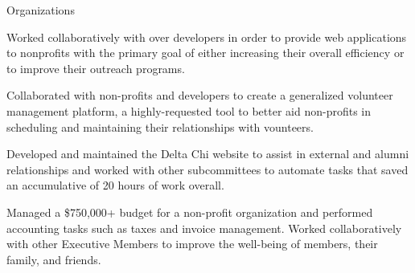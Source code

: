 \documentclass{resume} %
\begin{document}
\begin{workSection}{Organizations}
    \customItem[
        title=Bits of Good,
        keyHighlight=Developer,
        duration=January 2023 – Present,
        location=Atlanta{,} GA
    ]
     \begin{bullets}
       \item Worked collaboratively with over developers in order to provide web applications to nonprofits with the primary goal of either increasing their overall efficiency or to improve their outreach programs.
       \item Collaborated with non-profits and developers to create a generalized volunteer management platform, a highly-requested tool to better aid non-profits in scheduling and maintaining their relationships with vounteers.

     \end{bullets}
    \customItem[
        title=Delta Chi Fraternity,
        keyHighlight=Treasurer{,} Technology Chair,
        duration=August 2021 – Present,
        location=Atlanta{,} GA
    ]
     \begin{bullets}
         \item Developed and maintained the Delta Chi website to assist in external and alumni relationships and worked with other subcommittees to automate tasks that saved an accumulative of 20 hours of work overall.
        \item Managed a \$750,000+ budget for a non-profit organization and performed accounting tasks such as taxes and invoice management. Worked collaboratively with other Executive Members to improve the well-being of members, their family, and friends.
     \end{bullets}
     
     
\end{workSection}
\end{document}
